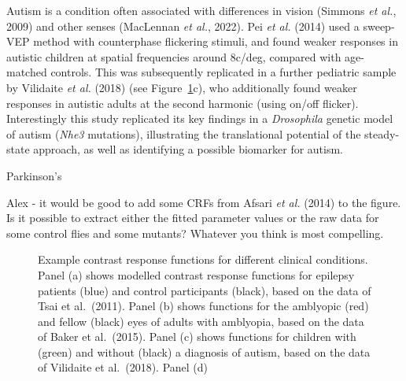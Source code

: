 \documentclass[
  letterpaper,
  DIV=11,
  numbers=noendperiod]{scrartcl}
\begin{document}
Autism is a condition often associated with differences in vision
(Simmons \emph{et al.}, 2009) and other senses (MacLennan \emph{et al.},
2022). Pei \emph{et al.} (2014) used a sweep-VEP method with
counterphase flickering stimuli, and found weaker responses in autistic
children at spatial frequencies around 8c/deg, compared with age-matched
controls. This was subsequently replicated in a further pediatric sample
by Vilidaite \emph{et al.} (2018) (see Figure~\ref{fig-plotclinical}c),
who additionally found weaker responses in autistic adults at the second
harmonic (using on/off flicker). Interestingly this study replicated its
key findings in a \emph{Drosophila} genetic model of autism (\emph{Nhe3}
mutations), illustrating the translational potential of the steady-state
approach, as well as identifying a possible biomarker for autism.

Parkinson's

Alex - it would be good to add some CRFs from Afsari \emph{et al.}
(2014) to the figure. Is it possible to extract either the fitted
parameter values or the raw data for some control flies and some
mutants? Whatever you think is most compelling.

\begin{figure}


\caption{\label{fig-plotclinical}Example contrast response functions for
different clinical conditions. Panel (a) shows modelled contrast
response functions for epilepsy patients (blue) and control participants
(black), based on the data of Tsai et al.~(2011). Panel (b) shows
functions for the amblyopic (red) and fellow (black) eyes of adults with
amblyopia, based on the data of Baker et al.~(2015). Panel (c) shows
functions for children with (green) and without (black) a diagnosis of
autism, based on the data of Vilidaite et al.~(2018). Panel (d)}

\end{figure}%
\end{document}
